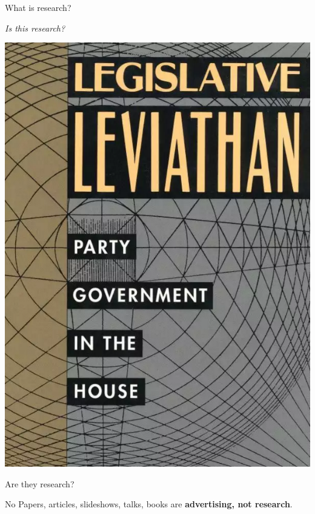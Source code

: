 \documentclass[10pt]{beamer}
\begin{document}
\begin{frame}{What is research?}

    \begin{center}
        {\large{\emph{Is this research?}}}

        \vspace{0.5cm}

        \includegraphics[scale=0.2]{img/cox.png}
    \end{center}
\end{frame}

\begin{frame}{Are they research?}

    \begin{alertblock}{No}
        Papers, articles, slideshows, talks, books are {\large{\textbf{advertising, not research}}}.
    \end{alertblock}

\end{frame}
\end{document}
